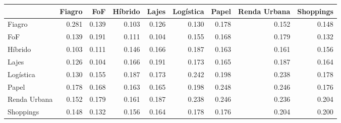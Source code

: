 \begin{tabular}{lrrrrrrrr}
\toprule
 & Fiagro & FoF & Híbrido & Lajes & Logística & Papel & Renda Urbana & Shoppings \\
\midrule
Fiagro & 0.281 & 0.139 & 0.103 & 0.126 & 0.130 & 0.178 & 0.152 & 0.148 \\
FoF & 0.139 & 0.191 & 0.111 & 0.104 & 0.155 & 0.168 & 0.179 & 0.132 \\
Híbrido & 0.103 & 0.111 & 0.146 & 0.166 & 0.187 & 0.163 & 0.161 & 0.156 \\
Lajes & 0.126 & 0.104 & 0.166 & 0.191 & 0.173 & 0.165 & 0.187 & 0.164 \\
Logística & 0.130 & 0.155 & 0.187 & 0.173 & 0.242 & 0.198 & 0.238 & 0.178 \\
Papel & 0.178 & 0.168 & 0.163 & 0.165 & 0.198 & 0.248 & 0.246 & 0.176 \\
Renda Urbana & 0.152 & 0.179 & 0.161 & 0.187 & 0.238 & 0.246 & 0.236 & 0.204 \\
Shoppings & 0.148 & 0.132 & 0.156 & 0.164 & 0.178 & 0.176 & 0.204 & 0.200 \\
\bottomrule
\end{tabular}
